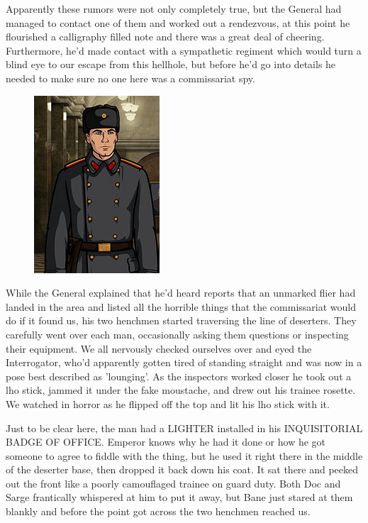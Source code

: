 Apparently these rumors were not only completely true, but the General had managed to contact one of them and worked out a rendezvous, at this point he flourished a calligraphy filled note and there was a great deal of cheering. 
Furthermore, he'd made contact with a sympathetic regiment which would turn a blind eye to our escape from this hellhole, but before he'd go into details he needed to make sure no one here was a commissariat spy.

\begin{figure}
	\begin{center}
		\includegraphics[width=\figwidth]{pics/9/27.png}
	\end{center}
\end{figure}
While the General explained that he'd heard reports that an unmarked flier had landed in the area and listed all the horrible things that the commissariat would do if it found us, his two henchmen started traversing the line of deserters. 
They carefully went over each man, occasionally asking them questions or inspecting their equipment. 
We all nervously checked ourselves over and eyed the Interrogator, who'd apparently gotten tired of standing straight and was now in a pose best described as 'lounging'. 
As the inspectors worked closer he took out a lho stick, jammed it under the fake moustache, and drew out his trainee rosette. 
We watched in horror as he flipped off the top and lit his lho stick with it.

Just to be clear here, the man had a LIGHTER installed in his INQUISITORIAL BADGE OF OFFICE. 
Emperor knows why he had it done or how he got someone to agree to fiddle with the thing, but he used it right there in the middle of the deserter base, then dropped it back down his coat. 
It sat there and peeked out the front like a poorly camouflaged trainee on guard duty. 
Both Doc and Sarge frantically whispered at him to put it away, but Bane just stared at them blankly and before the point got across the two henchmen reached us.

